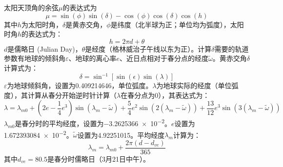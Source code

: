 太阳天顶角的余弦$\mu$的表达式为
\begin{equation}
\mu= \sin(\phi)\sin(\delta)−\cos(\phi)\cos(\delta)\cos(h)
\end{equation}
%
其中$h$为太阳时角，$\delta$是黄赤交角，$\phi$是纬度（北半球为正；单位均为弧度），太阳时角$h$的表达式为：
\begin{equation}
h=2\pi d+\theta
\end{equation}
$d$是儒略日 (Julian Day)，$\theta$是经度（格林威治子午线以东为正）。计算$\delta$需要的轨道参数有地球的倾斜角$\varepsilon$、地球的离心率$e$、近日点相对于春分点的经度$\widetilde{\omega}$。黄赤交角$\delta$计算式为：
\begin{equation}
\delta= \sin^{−1}[\sin(\epsilon) \sin(\lambda)]
\end{equation}
%
$\varepsilon$为地球倾斜角，设置为\num{0.409214646}，单位弧度。$\lambda$为地球实际的经度（单位弧度），其计算从春分开始逆时针计算（$\lambda$在春分点为0），其表达式为：
\begin{equation}
\lambda = \lambda_{m0} + \left( 2e - \frac{1}{4}e^{3} \right)\sin\left( \lambda_{m} - \widetilde{\omega} \right) + \frac{5}{4}e^{2}\sin(2\left( \lambda_{m} - \widetilde{\omega} \right) ) + \frac{13}{12}e^{3}\sin(3\left( \lambda_{m} - \widetilde{\omega} \right))
\end{equation}
%
$\lambda_{m0}$是春分时的平均经度，设置为\num{-3.2625366e-2}。$e$设置为\num{1.672393084e-2}。$\widetilde{\omega}$设置为\num{4.92251015}。平均经度$\lambda_{m}$计算为：
%
\begin{equation}
\lambda_{m} = \lambda_{m0} + \frac{2\pi\left( d - d_{ve} \right)}{365}
\end{equation}
%
其中\(d_{ve} = 80.5\)是春分时儒略日（3月21日中午）。
